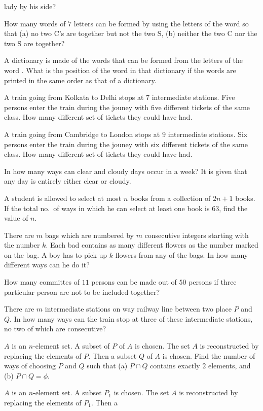   lady by his side?
\item How many words of $7$ letters can be formed by using the letters of the word  so that (a) no two C's are together
  but not the two S, (b) neither the two C nor the two S are together?
\item A dictionary is made of the words that can be formed from the letters of the word . What is the position of the
  word  in that dictionary if the words are printed in the same order as that of a dictionary.
\item A train going from Kolkata to Delhi stops at $7$ intermediate stations. Five persons enter the train during the jouney with
  five different tickets of the same class. How many different set of tickets they could have had.
\item A train going from Cambridge to London stops at $9$ intermediate stations. Six persons enter the train during the jouney with
  six different tickets of the same class. How many different set of tickets they could have had.
\item In how many ways can clear and cloudy days occur in a week? It is given that any day is entirely either clear or cloudy.
\item A student is allowed to select at most $n$ books from a collection of $2n + 1$ books. If the total no.\ of ways in which he
  can select at least one book is $63$, find the value of $n$.
\item There are $m$ bags which are numbered by $m$ consecutive integers starting with the number $k$. Each bad contains as many
  different flowers as the  number marked on the bag. A boy has to pick up $k$ flowers from any of the bags. In how many different
  ways can he do it?
\item How many committes of $11$ persons can be made out of $50$ persons if three particular person are not to be included
  together?
\item There are $m$ intermediate stations on way railway line between two place $P$ and $Q$. In how many ways can the train stop at
  three of these intermediate stations, no two of which are consecutive?
\item $A$ is an $n$-element set. A subset of $P$ of $A$ is chosen. The set $A$ is reconstructed by replacing the elements of
  $P$. Then a subset $Q$ of $A$ is chosen. Find the number of ways of choosing $P$ and $Q$ such that (a) $P\cap Q$ contains
  exactly $2$ elements, and (b) $P\cap Q = \phi$.
\item $A$ is an $n$-element set. A subset $P_1$ is chosen. The set $A$ is reconstructed by replacing the elements of $P_1$. Then a
